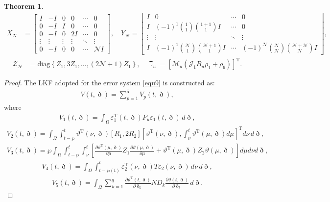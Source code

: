 \documentclass[preprint,review,fleqn,sort&compress,3p]{elsarticle}
\theoremstyle{definition}%
\newtheorem{thm}{Theorem}[section]
\begin{document}
\begin{thm}
\begin{align*}
		X_\mathcal{N} &= \begin{bmatrix} 
			I & -I & 0 & 0 & \cdots & 0 \\
			0 & -I & I & 0 & \cdots & 0 \\
			0 & -I & 0 & 2I & \cdots & 0 \\
			\vdots & \vdots & \vdots & \vdots & \ddots & \vdots \\
			0 & -I & 0 & 0 & \cdots & \mathcal{N}I
		\end{bmatrix},\quad
		Y_\mathcal{N} = \begin{bmatrix}
			I & 0 & \cdots & 0 \\
			I & (-1)^1 \binom{1}{1}\binom{1+1}{1}I & \cdots & 0 \\
			\vdots & \vdots & \ddots & \vdots \\
			I & (-1)^1 \binom{\mathcal{N}}{1}\binom{\mathcal{N}+1}{1}I & \cdots & (-1)^\mathcal{N} \binom{\mathcal{N}}{\mathcal{N}} \binom{\mathcal{N}+\mathcal{N}}{\mathcal{N}}I
		\end{bmatrix},
	\end{align*}
	\begin{align*}
		\mathcal{Z}_\mathcal{N}&=\text{diag}\left\{Z_1,3Z_1,\dots,(2\mathcal{N}+1)Z_1\right\}, \quad \daleth_u=\left[ \mathcal{M}_u \left( \mathcal{J}_1 B_u \rho_1  + \rho_{9}  \right) \right]^\text{T}.
	\end{align*}
	
	\begin{proof}
		The LKF adopted for the error system \eqref{equ9} is constructed as:
		\begin{align}\label{LKF}
			V(t,\eth)=\sum_{p=1}^{5}V_{p}(t,\eth),
		\end{align}
		where
		\begin{align}\label{V1}
			V_1(t, \eth) = \int_\Omega \varepsilon_1^\text{T}(t, \eth) P_u \varepsilon_1(t, \eth) \, d\eth,
		\end{align}
		\begin{align}\label{V2}
			V_2(t, \eth) = \int_\Omega \int_{t-\wp}^t \vartheta^\text{T}(\nu, \eth) \left[R_1,2R_2\right] \left[ \vartheta^\text{T}(\nu, \eth), \int_\nu^t \vartheta^\text{T}(\mu, \eth) d\mu \right]^\text{T} d\nu \, d\eth,
		\end{align}
		\begin{align}\label{V3}
			V_3(t, \eth) = \wp \int_\Omega \int_{t-\wp}^t \int_\nu^t \left[ \frac{\partial \vartheta^\text{T}(\mu, \eth)}{\partial \mu} Z_1 \frac{\partial \vartheta(\mu, \eth)}{\partial \mu} + \vartheta^\text{T}(\mu, \eth) Z_2 \vartheta(\mu, \eth) \right] d\mu d\nu d\eth,
		\end{align}
		\begin{align}\label{V4}
			V_4(t, \eth) = \int_\Omega \int_{t - \wp(t)}^t \varepsilon_2^\text{T}(\nu, \eth) T \varepsilon_2(\nu, \eth) \, d\nu \, d\eth,
		\end{align}
		\begin{align}\label{V5}
			V_5(t, \eth) = \int_\Omega \sum_{k=1}^{q} \frac{\partial \vartheta^\text{T}(t, \eth)}{\partial \eth_k} N D_k \frac{\partial \vartheta(t, \eth)}{\partial \eth_k} \, d\eth.
		\end{align}
		

\end{proof}
\end{thm}
\end{document}
